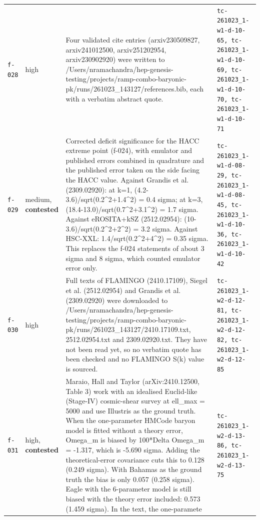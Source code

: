 \documentclass[11pt,a4paper]{article}
\begin{document}
\begin{longtable}{@{}p{}p{}p{}p{}@{}}
\texttt{f-028} & high & Four validated cite entries (arxiv230509827, arxiv241012500, arxiv251202954, arxiv230902920) were written to /Users/nramachandra/hep-genesis-testing/projects/ramp-combo-baryonic-pk/runs/261023\_143127/references.bib, each with a verbatim abstract quote. & \texttt{tc-261023\_\allowbreak{}1-w1-d-10-65,\allowbreak{} tc-261023\_\allowbreak{}1-w1-d-10-69,\allowbreak{} tc-261023\_\allowbreak{}1-w1-d-10-70,\allowbreak{} tc-261023\_\allowbreak{}1-w1-d-10-71} \\
\texttt{f-029} & medium, \textbf{contested} & Corrected deficit significance for the HACC extreme point (f-024), with emulator and published errors combined in quadrature and the published error taken on the side facing the HACC value. Against Grandis et al. (2309.02920): at k=1, (4.2-3.6)/sqrt(0.2\textasciicircum{}2+1.4\textasciicircum{}2) = 0.4 sigma; at k=3, (18.4-13.0)/sqrt(0.7\textasciicircum{}2+3.1\textasciicircum{}2) = 1.7 sigma. Against eROSITA+kSZ (2512.02954): (10-3.6)/sqrt(0.2\textasciicircum{}2+2\textasciicircum{}2) = 3.2 sigma. Against HSC-XXL: 1.4/sqrt(0.2\textasciicircum{}2+4\textasciicircum{}2) = 0.35 sigma. This replaces the f-024 statements of about 3 sigma and 8 sigma, which counted emulator error only. & \texttt{tc-261023\_\allowbreak{}1-w1-d-08-29,\allowbreak{} tc-261023\_\allowbreak{}1-w1-d-08-45,\allowbreak{} tc-261023\_\allowbreak{}1-w1-d-10-36,\allowbreak{} tc-261023\_\allowbreak{}1-w1-d-10-42} \\
\texttt{f-030} & high & Full texts of FLAMINGO (2410.17109), Siegel et al. (2512.02954) and Grandis et al. (2309.02920) were downloaded to /Users/nramachandra/hep-genesis-testing/projects/ramp-combo-baryonic-pk/runs/261023\_143127/2410.17109.txt, 2512.02954.txt and 2309.02920.txt. They have not been read yet, so no verbatim quote has been checked and no FLAMINGO S(k) value is sourced. & \texttt{tc-261023\_\allowbreak{}1-w2-d-12-81,\allowbreak{} tc-261023\_\allowbreak{}1-w2-d-12-82,\allowbreak{} tc-261023\_\allowbreak{}1-w2-d-12-85} \\
\texttt{f-031} & high, \textbf{contested} & Maraio, Hall and Taylor (arXiv:2410.12500, Table 3) work with an idealised Euclid-like (Stage-IV) cosmic-shear survey at ell\_max = 5000 and use Illustris as the ground truth. When the one-parameter HMCode baryon model is fitted without a theory error, Omega\_m is biased by 100*Delta Omega\_m = -1.317, which is -5.690 sigma. Adding the theoretical-error covariance cuts this to 0.128 (0.249 sigma). With Bahamas as the ground truth the bias is only 0.057 (0.258 sigma). Eagle with the 6-parameter model is still biased with the theory error included: 0.573 (1.459 sigma). In the text, the one-paramete & \texttt{tc-261023\_\allowbreak{}1-w2-d-13-86,\allowbreak{} tc-261023\_\allowbreak{}1-w2-d-13-75} \\

\end{longtable}
\end{document}
